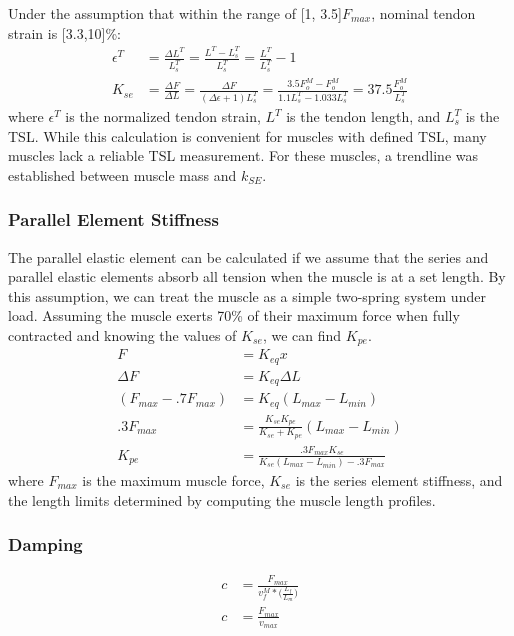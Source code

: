 \documentclass[runningheads,a4paper]{llncs}
\begin{document}
		 Under the assumption that within the range of [1, 3.5]$F_{max}$, nominal tendon strain is [3.3,10]\%:
			\begin{align*}
				\epsilon^{T} &= \frac{\Delta L^{T}}{L_{s}^{T}}
				= \frac{L^{T}-L_{s}^{T}}{L_{s}^{T}}
				= \frac{L^{T}}{L_{s}^{T}} - 1 \\
				K_{se} &= \frac{\Delta F}{\Delta L}
				= \frac{\Delta F}{(\Delta \epsilon+1)L_{s}^{T}}
				= \frac{3.5 F_{o}^{M} - F_{o}^{M}}{1.1 L_{s}^{T} - 1.033 L_{s}^{T}}
				= 37.5 \frac{F_{o}^{M}}{L_{s}^{T}}
			\end{align*}
		where $\epsilon^{T}$ is the normalized tendon strain, $L^{T}$ is the tendon length, and $L_{s}^{T}$ is the TSL. While this calculation is convenient for muscles with defined TSL, many muscles lack a reliable TSL measurement. For these muscles, a trendline was established between muscle mass and $k_{SE}$.
	\subsubsection{Parallel Element Stiffness}
		The parallel elastic element can be calculated if we assume that the series and parallel elastic elements absorb all tension when the muscle is at a set length. By this assumption, we can treat the muscle as a simple two-spring system under load. Assuming the muscle exerts 70\% of their maximum force when fully contracted and knowing the values of $K_{se}$, we can find $K_{pe}$.
			\begin{align*}
				F &= K_{eq} x \\
				\Delta F &= K_{eq} \Delta L \\
				(F_{max} - .7 F_{max}) &= K_{eq} (L_{max}-L_{min}) \\
				.3 F_{max} &= \frac{K_{se}K_{pe}}{K_{se}+K_{pe}} (L_{max}-L_{min}) \\
				K_{pe} &= \frac{.3 F_{max} K_{se}}{K_{se} (L_{max}-L_{min})- .3 F_{max}}
			\end{align*}
		where $F_{max}$ is the maximum muscle force\cite{johnson_application_2011}, $K_{se}$ is the series element stiffness, and the length limits determined by computing the muscle length profiles.
	\subsubsection{Damping}
		\begin{align*}
			c &= \frac{F_{max}}{v_{f}^{M}*\big(\frac{L_{f}}{L_{m}}\big)} \\
			c &= \frac{F_{max}}{v_{max}} \\
		\end{align*}
\end{document}
